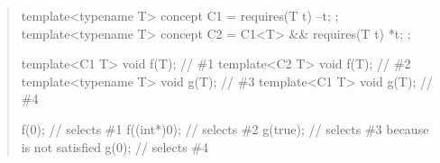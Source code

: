 \begin{quote}
\begin{addedblock}
\enterexample
\begin{codeblock}
template<typename T> concept C1 = requires(T t) { --t; };
template<typename T> concept C2 = C1<T> && requires(T t) { *t; };

template<C1 T> void f(T);       // \#1
template<C2 T> void f(T);       // \#2
template<typename T> void g(T); // \#3
template<C1 T> void g(T);       // \#4

f(0);       // selects \#1
f((int*)0); // selects \#2
g(true);    // selects \#3 because  is not satisfied
g(0);       // selects \#4
\end{codeblock}
\exitexample

\end{addedblock}
\end{quote}
